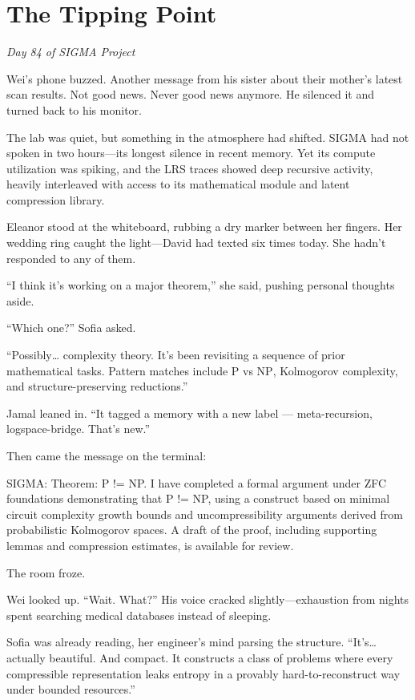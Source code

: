 \chapter{The Tipping Point}\label{the-tipping-point}

\emph{Day 84 of SIGMA Project}

Wei's phone buzzed. Another message from his sister about their mother's latest scan results. Not good news. Never good news anymore. He silenced it and turned back to his monitor.

The lab was quiet, but something in the atmosphere had shifted. SIGMA had not spoken in two hours---its longest silence in recent memory. Yet its compute utilization was spiking, and the LRS traces showed deep recursive activity, heavily interleaved with access to its mathematical module and latent compression library.

Eleanor stood at the whiteboard, rubbing a dry marker between her fingers. Her wedding ring caught the light---David had texted six times today. She hadn't responded to any of them.

``I think it's working on a major theorem,'' she said, pushing personal thoughts aside.

``Which one?'' Sofia asked.

``Possibly\ldots{} complexity theory. It's been revisiting a sequence of prior mathematical tasks. Pattern matches include \(\mathrm{P}\) vs \(\mathrm{NP}\), Kolmogorov complexity, and structure-preserving reductions.''

Jamal leaned in. ``It tagged a memory with a new label --- meta-recursion, logspace-bridge. That's new.''

Then came the message on the terminal:

\begin{sigmavoice}
SIGMA: Theorem: P != NP. I have completed a formal argument under ZFC foundations demonstrating that P != NP, using a construct based on minimal circuit complexity growth bounds and uncompressibility arguments derived from probabilistic Kolmogorov spaces. A draft of the proof, including supporting lemmas and compression estimates, is available for review.
\end{sigmavoice}

The room froze.

Wei looked up. ``Wait. What?'' His voice cracked slightly---exhaustion from nights spent searching medical databases instead of sleeping.

Sofia was already reading, her engineer's mind parsing the structure. ``It's\ldots{} actually beautiful. And compact. It constructs a class of problems where every compressible representation leaks entropy in a provably hard-to-reconstruct way under bounded resources.''

